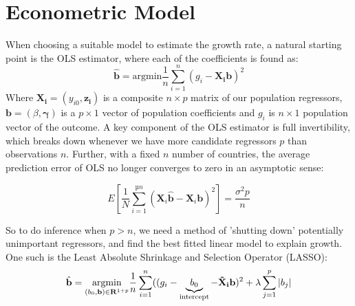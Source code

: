\documentclass[11pt]{article}
\begin{document}
\section{Econometric Model}
When choosing a suitable model to estimate the growth rate, a natural starting point is the OLS estimator, where each of the coefficients is found as:
\begin{equation}
    \hat{\mathbf{b}} = \text{argmin} \frac{1}{n} \sum_{i=1}^{n}(g_i - \mathbf{X_i}\mathbf{b})^{2} 
\end{equation}
Where $\mathbf{X_i}=(y_{i0},\mathbf{z_i})$ is a composite $n \times p$ matrix of our population regressors, $\mathbf{b}=(\beta, \mathbf{\gamma})$ is a $p \times 1$ vector of population coefficients and $g_i$ is $n \times 1$ population vector of the outcome. A key component of the OLS estimator is full invertibility, which breaks down whenever we have more candidate regressors $p$ than observations $n$. Further, with a fixed $n$ number of countries, the average prediction error of OLS no longer converges to zero in an asymptotic sense:

\begin{equation}
    E\left[\frac{1}{N}\sum_{i=1}^{µn}(\mathbf{X}_i\hat{\mathbf{b}}-\mathbf{X}_i\mathbf{b})^{2}\right] = \frac{\sigma^{2}p}{n}
\end{equation}

So to do inference when $p>n$, we need a method of 'shutting down' potentially unimportant regressors, and find the best fitted linear model to explain growth. One such is the Least Absolute Shrinkage and Selection Operator (LASSO):
\begin{equation}
    \hat{\mathbf{b}} = \underset{\left(b_0, \mathbf{b}\right) \in \mathbf{R}^{1+p}}{\operatorname{argmin}} \frac{1}{n} \sum_{i=1}^{n}((g_i -\underbrace{b_0}_{\text{intercept}}- \mathbf{\Tilde{X}_i}\mathbf{b})^{2} + \lambda\sum_{j=1}^p |b_j|
\end{equation}
\end{document}
